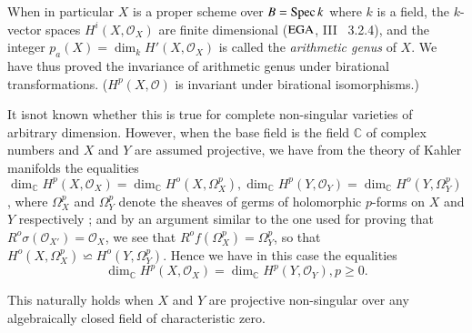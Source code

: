 When in particular $X$ is a proper scheme over $B = \operatorname{Spec} k$ where $k$
is a field, the $k$-vector spaces $H^i (X, \mathscr{O}_X)$ are finite
dimensional ($\operatorname{EGA}$, III~ 3.2.4), and the integer $p_a (X)= \dim_k
H'(X, \mathscr{O}_X)$ is called the \textit{arithmetic genus} of
$X$. We have thus proved the invariance of arithmetic genus under
birational transformations. ($H^p( X, \mathscr{O})$ is invariant under
birational isomorphisms.) 

It is\pageoriginale not known whether this is true for complete non-singular
varieties of arbitrary dimension. However, when the base field is the
field $\mathbb{C}$ of complex numbers and $X$ and $Y$ are assumed
projective, we have from the theory of Kahler manifolds the equalities
$\dim_\mathbb{C} H^{p}(X, \mathscr{O}_X)= \dim_\mathbb{C} H^o (X,
\Omega^{p}_{X}), \dim_\mathbb{C} H^{p}(Y, \mathscr{O}_Y)=
\dim_\mathbb{C} H^{o}(Y, \Omega^{p}_{Y})$, where $\Omega^{p}_{X}$ and
$\Omega^{p}_{Y}$ denote the sheaves of germs of holomorphic $p$-forms
on $X$ and $Y$ respectively ;  and by an argument similar to the one
used for proving that $R^o \sigma (\mathscr{O}_{X'}) =
\mathscr{O}_{X}$, we see that $R^{o} f (\Omega^{p}_{X}) =
\Omega^{p}_{Y}$, so that $H^{o}(X, \Omega^{p}_{X}) \backsimeq H^{o}(Y,
\Omega^{p}_{Y})$. Hence we have in this case the equalities
$$
\dim_\mathbb{C} H^p (X, \mathscr{O}_X) = \dim_\mathbb{C} H^p (Y,
\mathscr{O}_Y), p \geq 0. 
$$

This naturally holds when $X$ and $Y$ are projective non-singular over
any algebraically closed field of characteristic zero. 

